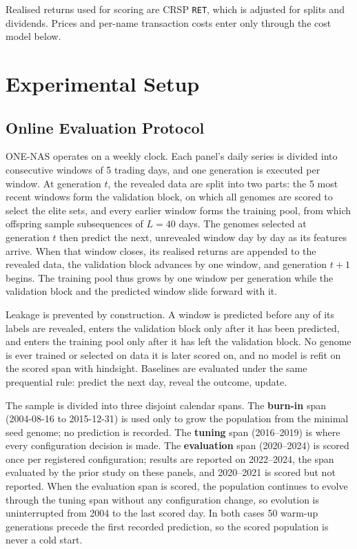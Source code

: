 Realised returns used for scoring are CRSP \texttt{RET}, which is adjusted
for splits and dividends. Prices and per-name transaction costs enter only
through the cost model below.

\section{Experimental Setup}
\label{sec:setup}

\subsection{Online Evaluation Protocol}
\label{sec:protocol}

ONE-NAS operates on a weekly clock. Each panel's daily series is divided
into consecutive windows of 5 trading days, and one generation is
executed per window. At generation $t$, the revealed data are split into
two parts: the 5 most recent windows form the validation block, on which
all genomes are scored to select the elite sets, and every earlier
window forms the training pool, from which offspring sample subsequences
of $L=40$ days. The genomes selected at generation $t$ then predict the
next, unrevealed window day by day as its features arrive. When that
window closes, its realised returns are appended to the revealed data,
the validation block advances by one window, and generation $t{+}1$
begins. The training pool thus grows by one window per generation while
the validation block and the predicted window slide forward with it.

Leakage is prevented by construction. A window is predicted before any
of its labels are revealed, enters the validation block only after it
has been predicted, and enters the training pool only after it has left
the validation block. No genome is ever trained or selected on data it
is later scored on, and no model is refit on the scored span with
hindsight. Baselines are evaluated under the same prequential rule:
predict the next day, reveal the outcome, update.

The sample is divided into three disjoint calendar spans. The
\textbf{burn-in} span (2004-08-16 to 2015-12-31) is used only to grow
the population from the minimal seed genome; no prediction is recorded.
The \textbf{tuning} span (2016--2019) is where every configuration
decision is made. The \textbf{evaluation} span (2020--2024) is scored
once per registered configuration; results are reported on 2022--2024,
the span evaluated by the prior study on these panels, and 2020--2021
is scored but not reported. When the evaluation span is scored, the
population continues to evolve through the tuning span without any
configuration change, so evolution is uninterrupted from 2004 to the
last scored day. In both cases 50 warm-up generations precede the first
recorded prediction, so the scored population is never a cold start.


